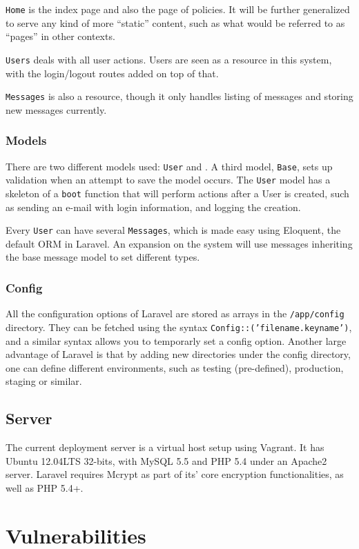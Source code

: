 \texttt{Home} is the index page and also the page of policies. It will be further generalized to serve any kind of more ``static'' content, such as what would be referred to as ``pages'' in other contexts.

\texttt{Users} deals with all user actions. Users are seen as a resource in this system, with the login/logout routes added on top of that.

\texttt{Messages} is also a resource, though it only handles listing of messages and storing new messages currently.

\subsubsection{Models}
\noindent
There are two different models used: \texttt{User} and . A third model, \texttt{Base}, sets up validation when an attempt to save the model occurs. The \texttt{User} model has a skeleton of a \texttt{boot} function that will perform actions after a User is created, such as sending an e-mail with login information, and logging the creation.

Every \texttt{User} can have several \texttt{Messages}, which is made easy using Eloquent, the default ORM in Laravel. An expansion on the system will use messages inheriting the base message model to set different types.

\subsubsection{Config}
\noindent
All the configuration options of Laravel are stored as arrays in the \texttt{/app/config} directory. They can be fetched using the syntax \texttt{Config::('filename.keyname')}, and a similar syntax allows you to temporarly set a config option. Another large advantage of Laravel is that by adding new directories under the config directory, one can define different environments, such as testing (pre-defined), production, staging or similar.

\subsection{Server}
\noindent
The current deployment server is a virtual host setup using Vagrant. It has Ubuntu 12.04LTS 32-bits, with MySQL 5.5 and PHP 5.4 under an Apache2 server. Laravel requires Mcrypt as part of its' core encryption functionalities, as well as PHP 5.4+.

\section{Vulnerabilities}
